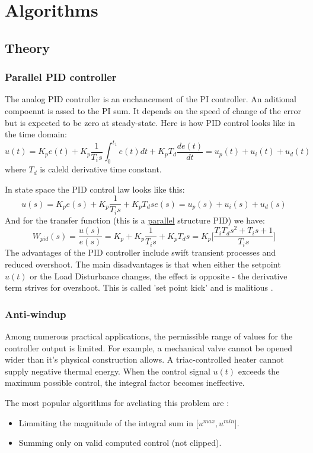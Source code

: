 \section{Algorithms}
\subsection{Theory}
\subsubsection{Parallel PID controller}
The analog PID controller is an enchancement of the PI controller.
An aditional compoennt is assed to the PI sum.
It depends on the speed of change of the error but is expected to be zero at steady-state.
Here is how PID control looks like in the time domain:
\begin{equation}
    u(t) = K_p e(t) + K_p \frac{1}{T_i s} \int_0^{t_1} e(t) dt + K_p T_d \frac{d e(t)}{dt} = u_p(t) + u_i(t) + u_d(t)
\end{equation}
where $T_d$ is caleld derivative time constant.
\par
In state space the PID control law looks like this:
\begin{equation}
    u(s) = K_p e(s) + K_p \frac{1}{T_i s} + K_p T_d s e(s) = u_p(s) + u_i(s) + u_d(s)
\end{equation}
And for the transfer function (this is a \underline{parallel} structure PID) we have:
\begin{equation}
    W_{pid}(s) = \frac{u(s)}{e(s)} = K_p + K_p \frac{1}{T_i s} + K_p T_d s =
    K_p \Bigg[ \frac{T_i T_d s^2 + T_i s + 1}{T_i s}  \Bigg]
\end{equation}
The advantages of the PID controller include swift transient processes and reduced overshoot.
The main disadvantages is that when either the setpoint $u(t)$ or the Load Disturbance changes,
the effect is opposite - the derivative term strives for overshoot.
This is called 'set point kick' and is malitious \cite[p. 33] {garipov}.

\subsubsection{Anti-windup}
Among numerous practical applications, the permissible range of values for the controller output is limited.
For example, a mechanical valve cannot be opened wider than it's physical construction allows.
A triac-controlled heater cannot supply negative thermal energy.
When the control signal $u(t)$ exceeds the maximum possible control, the integral factor becomes ineffective.
\par
The most popular algorithms for aveliating this problem are \cite[p. 49] {garipov}:
\begin{itemize}
\item{Limmiting the magnitude of the integral sum in [$u^{max}, u^{min}]$}.
\item{Summing only on valid computed control (not clipped). }
\end{itemize}

